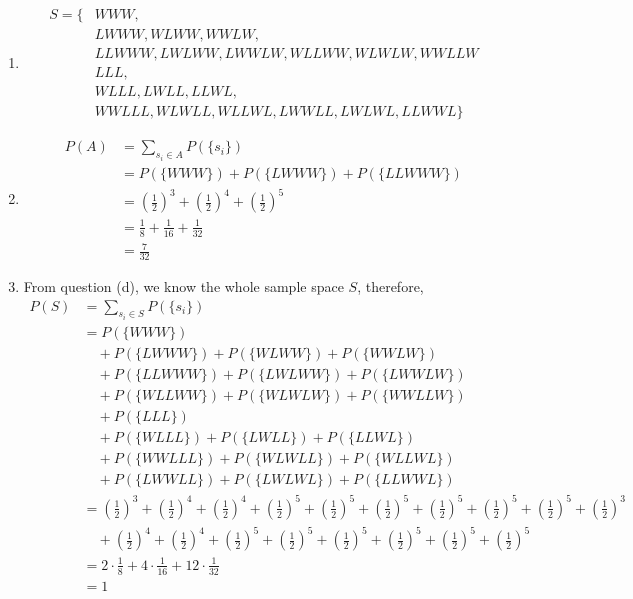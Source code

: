 \documentclass[a4paper, 12pt]{article}
\begin{document}
\begin{enumerate}
\begin{enumerate}
		\item $$\begin{aligned}S=\{
				&WWW, \\
				&LWWW, WLWW, WWLW,\\
				&LLWWW, LWLWW, LWWLW, WLLWW, WLWLW, WWLLW\\
				&LLL, \\
				&WLLL, LWLL, LLWL, \\
				&WWLLL, WLWLL, WLLWL, LWWLL, LWLWL, LLWWL\}\end{aligned}$$
		\item $$\begin{aligned}
				P(A) 
				&= \sum_{s_i\in A}P(\{s_i\})\\
				&= P(\{WWW\}) + P(\{LWWW\}) + P(\{LLWWW\})\\
				&= (\frac{1}{2})^3 + (\frac{1}{2})^4 + (\frac{1}{2})^5\\
				&= \frac{1}{8} + \frac{1}{16} + \frac{1}{32}\\
				&= \frac{7}{32}
			\end{aligned}$$
		\item From question (d), we know the whole sample space $S$, therefore,
			$$\begin{aligned}
				P(S) &= \sum_{s_i\in S}P(\{s_i\})\\
					 &= P(\{WWW\}) \\
					 &\quad+ P(\{LWWW\}) + P(\{WLWW\}) + P(\{WWLW\})\\
					 &\quad+ P(\{LLWWW\}) + P(\{LWLWW\}) + P(\{LWWLW\})\\
					 &\quad+ P(\{WLLWW\}) + P(\{WLWLW\}) + P(\{WWLLW\})\\
					 &\quad+ P(\{LLL\})\\
					 &\quad+ P(\{WLLL\}) + P(\{LWLL\}) + P(\{LLWL\})\\
					 &\quad+ P(\{WWLLL\}) + P(\{WLWLL\}) + P(\{WLLWL\})\\
					 &\quad+ P(\{LWWLL\}) + P(\{LWLWL\}) + P(\{LLWWL\})\\
					 &= (\frac{1}{2})^3 + (\frac{1}{2})^4 + (\frac{1}{2})^4 + 
					 (\frac{1}{2})^5 + (\frac{1}{2})^5 + (\frac{1}{2})^5 + 
					 (\frac{1}{2})^5 + (\frac{1}{2})^5 + (\frac{1}{2})^5 + 
				(\frac{1}{2})^3\\ 
					 &\quad+ (\frac{1}{2})^4 + (\frac{1}{2})^4 + 
					 (\frac{1}{2})^5 + (\frac{1}{2})^5 + (\frac{1}{2})^5 + 
					 (\frac{1}{2})^5 + (\frac{1}{2})^5 + (\frac{1}{2})^5\\
					 &= 2\cdot \frac{1}{8} + 4\cdot\frac{1}{16} + 
					 12\cdot\frac{1}{32}\\
					 &= 1
			\end{aligned}$$
\end{enumerate}
\end{enumerate}
\end{document}
